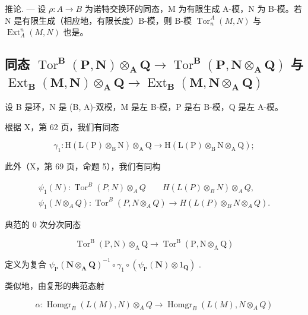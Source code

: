 推论. --- 设 \(\rho: A \to B\) 为诺特交换环的同态，M 为有限生成 A-模，N 为 B-模。若 N 是有限生成（相应地，有限长度）B-模，则 B-模 \(\operatorname{Tor}_{n}^{A}(M, N)\) 与 \(\operatorname{Ext}_{A}^{n}(M, N)\) 也是。

\subsection{\texorpdfstring{同态 \(\operatorname{Tor}^{\mathbf{B}}(\mathbf{P},\mathbf{N})\otimes_{\mathbf{A}}\mathbf{Q}\to \operatorname{Tor}^{\mathbf{B}}(\mathbf{P},\mathbf{N}\otimes_{\mathbf{A}}\mathbf{Q})\) 与 \(\operatorname{Ext}_{\mathbf{B}}(\mathbf{M},\mathbf{N})\otimes_{\mathbf{A}}\mathbf{Q}\rightarrow \operatorname{Ext}_{\mathbf{B}}(\mathbf{M},\mathbf{N}\otimes_{\mathbf{A}}\mathbf{Q})\)}{张量积下的 Tor 与 Ext 同态}}

设 B 是环，N 是 (B, A)-双模，M 是左 B-模，P 是右 B-模，Q 是左 A-模。

根据 X，第 62 页，我们有同态

\[
\gamma_ {1}: \mathrm{H} (\mathrm{L} (\mathrm{P}) \otimes_ {\mathrm{B}} \mathrm{N}) \otimes_ {\mathrm{A}} \mathrm{Q} \rightarrow \mathrm{H} (\mathrm{L} (\mathrm{P}) \otimes_ {\mathrm{B}} \mathrm{N} \otimes_ {\mathrm{A}} \mathrm{Q});
\]

此外（X，第 69 页，命题 5），我们有同构

\[
\begin{array}{c} \psi_ {1} (N): \operatorname{Tor} ^ {B} (P, N) \otimes_ {A} Q \qquad H (L (P) \otimes_ {B} N) \otimes_ {A} Q, \\ \psi_ {1} (N \otimes_ {A} Q): \operatorname{Tor} ^ {B} (P, N \otimes_ {A} Q) \to H (L (P) \otimes_ {B} N \otimes_ {A} Q). \end{array}
\]

典范的 0 次分次同态

\[
\operatorname{Tor} ^ {\mathrm{B}} (\mathrm{P}, \mathrm{N}) \otimes_ {\mathrm{A}} \mathrm{Q} \rightarrow \operatorname{Tor} ^ {\mathrm{B}} (\mathrm{P}, \mathrm{N} \otimes_ {\mathrm{A}} \mathrm{Q})\tag{9}
\]

定义为复合 \(\psi_{\mathrm{P}}(\mathbf{N}\otimes_{\mathbf{A}}\mathbf{Q})^{-1}\circ \gamma_{1}\circ (\psi_{\mathrm{P}}(\mathbf{N})\otimes 1_{\mathbf{Q}})\) .

类似地，由复形的典范态射

\[
\alpha : \operatorname{Homgr} _ {B} (L (M), N) \otimes_ {A} Q \rightarrow \operatorname{Homgr} _ {B} (L (M), N \otimes_ {A} Q)
\]

